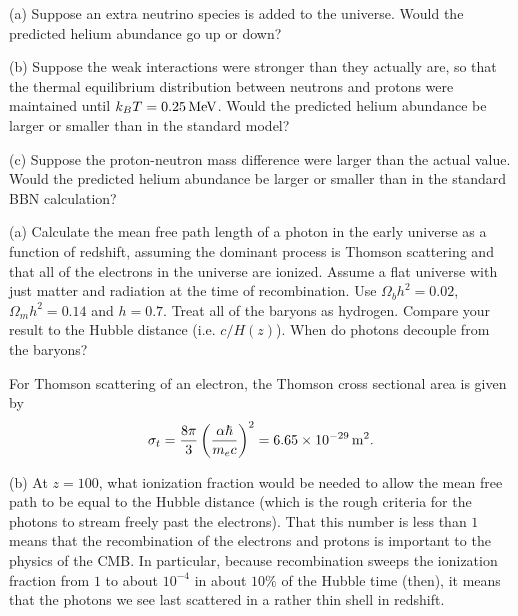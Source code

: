 \documentclass{lkx_pset}
\begin{document}
\begin{problem}{3}
\end{problem}
\begin{parts}
  \begin{part}{(a)}
    Suppose an extra neutrino species is added to the universe. Would the predicted helium abundance go up or down?
  \end{part}

  \begin{part}{(b)}
    Suppose the weak interactions were stronger than they actually are, so that the thermal equilibrium distribution between neutrons and protons were maintained until $k_B T = \MeVsi{0.25}$. Would the predicted helium abundance be larger or smaller than in the standard model?
  \end{part}

  \begin{part}{(c)}
    Suppose the proton-neutron mass difference were larger than the actual value. Would the predicted helium abundance be larger or smaller than in the standard BBN calculation?
  \end{part}
\end{parts}

\begin{problem}{4}
\end{problem}
\begin{parts}
  \begin{part}{(a)}
    Calculate the mean free path length of a photon in the early universe as a function of redshift, assuming the dominant process is Thomson scattering and that all of the electrons in the universe are ionized. Assume a flat universe with just matter and radiation at the time of recombination. Use $\Omega_b h^2 = 0.02$, $\Omega_m h^2=0.14$ and $h=0.7$. Treat all of the baryons as hydrogen. Compare your result to the Hubble distance (i.e. $c/H(z)$). When do photons decouple from the baryons?
  \end{part}

  For Thomson scattering of an electron, the Thomson cross sectional area is given by
  \[
    \sigma_t = \frac{8\pi}{3}\left(\frac{\alpha\hbar}{m_e c}\right)^2 = \mmsi{6.65e-29}.
  \]

  \begin{part}{(b)}
    At $z=100$, what ionization fraction would be needed to allow the mean free path to be equal to the Hubble distance (which is the rough criteria for the photons to stream freely past the electrons). That this number is less than $1$ means that the recombination of the electrons and protons is important to the physics of the CMB. In particular, because recombination sweeps the ionization fraction from $1$ to about $10^{-4}$ in about $10\%$ of the Hubble time (then), it means that the photons we see last scattered in a rather thin shell in redshift.
  \end{part}
\end{parts}
\end{document}
